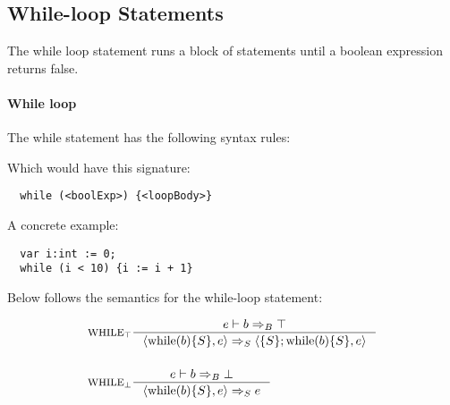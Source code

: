 \subsection{While-loop Statements}
\label{subsec:whileLoopStatements}

The while loop statement runs a block of statements until a boolean expression returns false.

\paragraph{While loop}
\label{sec:whileLoop}

The while statement has the following syntax rules:


Which would have this signature:

\begin{verbatim}
  while (<boolExp>) {<loopBody>}
\end{verbatim}

A concrete example:

\begin{verbatim}
  var i:int := 0;
  while (i < 10) {i := i + 1}
\end{verbatim}

Below follows the semantics for the while-loop statement:

\begin{align*}
&\inference[$\text{WHILE}_\top$]{e \vdash b \Rightarrow_B \top}
                       {\Braket{\Twhile(b)\{S\},e} \Rightarrow_S \Braket{\{S\}; \Twhile (b)\{S\},e}}
\\\\
&\inference[$\text{WHILE}_\bot$]{e \vdash b \Rightarrow_B \bot}
                       {\Braket{\Twhile(b)\{S\},e} \Rightarrow_S e}
\end{align*}